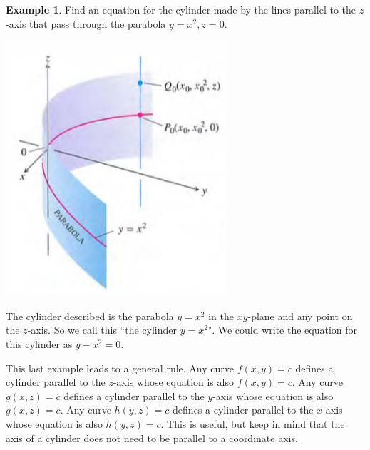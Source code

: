 \documentclass[12pt, letter]{article}
\theoremstyle{plain}
\numberwithin{theorem}{section}
\theoremstyle{definition}
\newtheorem{example}[theorem]{Example}
\begin{document}
\hrulefill

\bigskip

\begin{example}
Find an equation for the cylinder made by the lines parallel to the $z$-axis that pass through the parabola $y=x^2, z=0$.\\

\bigskip

\begin{center}
\includegraphics[scale=0.6]{m1_f23}
\end{center}

\bigskip

The cylinder described is the parabola $y=x^2$ in the $xy$-plane and any point on the $z$-axis. So we call this ``the cylinder $y=x^2$". We could write the equation for this cylinder as $y-x^2=0$.
\end{example}

\bigskip

\hrulefill

\bigskip

This last example leads to a general rule. Any curve $f(x,y) = c$ defines a cylinder parallel to the $z$-axis whose equation is also $f(x,y) = c$. Any curve $g(x,z) = c$ defines a cylinder parallel to the $y$-axis whose equation is also $g(x,z) = c$. Any curve $h(y,z) = c$ defines a cylinder parallel to the $x$-axis whose equation is also $h(y,z) = c$. This is useful, but keep in mind that the axis of a cylinder does not need to be parallel to a coordinate axis.

\bigskip

\hrulefill

\bigskip
\end{document}
